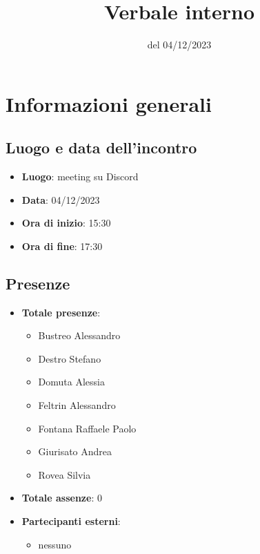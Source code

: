 \documentclass[12pt]{article}
\title{Verbale interno}
\date{del 04/12/2023}
\begin{document}
	\makefirstpage
	
	
	\clearpage
	
	\tableofcontents
	\clearpage

    \section{Informazioni generali}
	
	\subsection{Luogo e data dell'incontro}
	
    	\begin{itemize}
    		\item \textbf{Luogo}: meeting su Discord
    		\item \textbf{Data}: 04/12/2023
    		\item \textbf{Ora di inizio}: 15:30
    		\item \textbf{Ora di fine}: 17:30
    	\end{itemize}
	
	\subsection{Presenze}
	
    	\begin{itemize}
    		\item \textbf{Totale presenze}:
    		\begin{itemize}
    			\item Bustreo Alessandro
    			\item Destro Stefano
    			\item Domuta Alessia 
    			\item Feltrin Alessandro 
    			\item Fontana Raffaele Paolo 
    			\item Giurisato Andrea 
    			\item Rovea Silvia
    		\end{itemize}
    		
    		\item \textbf{Totale assenze}: 0
    		
    		\item \textbf{Partecipanti esterni}:
    		\begin{itemize}
    			\item nessuno
    		\end{itemize}
    	\end{itemize}
\end{document}
